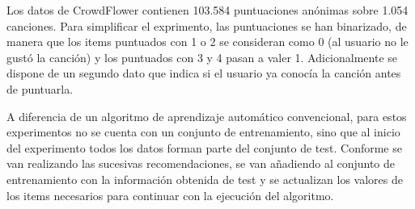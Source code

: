 Los datos de CrowdFlower \cite{cm100k} contienen 103.584 puntuaciones anónimas sobre 1.054 canciones. Para simplificar el exprimento, las puntuaciones se han binarizado, de manera que los items puntuados con 1 o 2 se consideran como 0 (al usuario no le gustó la canción) y los puntuados con 3 y 4 pasan a valer 1. Adicionalmente se dispone de un segundo dato que indica si el usuario ya conocía la canción antes de puntuarla.

A diferencia de un algoritmo de aprendizaje automático convencional, para estos experimentos no se cuenta con un conjunto de entrenamiento, sino que al inicio del experimento todos los datos forman parte del conjunto de test. Conforme se van realizando las sucesivas recomendaciones, se van añadiendo al conjunto de entrenamiento con la información obtenida de test y se actualizan los valores de los items necesarios para continuar con la ejecución del algoritmo.
